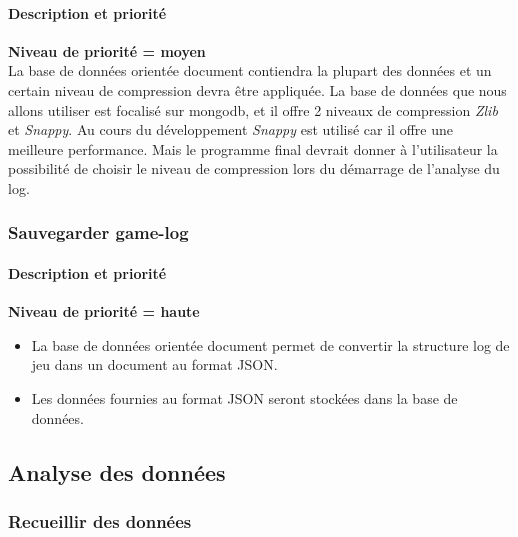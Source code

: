 \paragraph*{Description et priorité}
\textbf{Niveau de priorité = moyen}\\

La base de données orientée document contiendra la plupart des données et un certain niveau de compression devra être appliquée.
La base de données que nous allons utiliser est focalisé sur mongodb, et il offre 2 niveaux de compression \textit{Zlib} et \textit{Snappy}.
Au cours du développement \textit{Snappy} est utilisé car il offre une meilleure performance.
Mais le programme final devrait donner à l'utilisateur la possibilité de choisir le niveau de compression lors du démarrage de l'analyse du log.

\subsubsection{Sauvegarder game-log}

\paragraph*{Description et priorité}
\textbf{Niveau de priorité = haute}\\
\begin{itemize}
\item La base de données orientée document permet de convertir la structure log de jeu dans un document au format JSON.
\item Les données fournies au format JSON seront stockées dans la base de données.
\end{itemize}
\subsection{Analyse des données}
\subsubsection{Recueillir des données}
